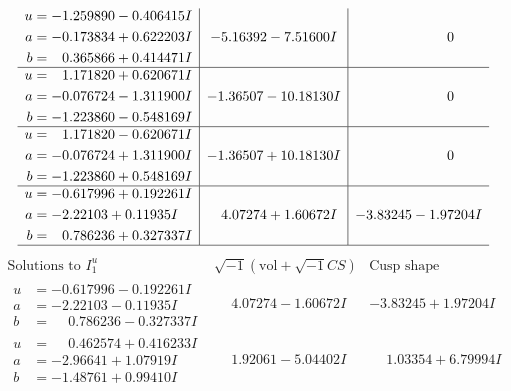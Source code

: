 \documentclass[1p]{elsarticle_modified}
\theoremstyle{definition}
\newcommand{\I}{\sqrt{-1}}
\begin{document}
$$\begin{array}{c|c|c}
\begin{aligned}
u &= -1.259890 - 0.406415 I \\
a &= -0.173834 + 0.622203 I \\
b &= \phantom{-}0.365866 + 0.414471 I\end{aligned}
 & -5.16392 - 7.51600 I & \phantom{-0.000000 } 0 \\ \hline\begin{aligned}
u &= \phantom{-}1.171820 + 0.620671 I \\
a &= -0.076724 - 1.311900 I \\
b &= -1.223860 - 0.548169 I\end{aligned}
 & -1.36507 - 10.18130 I & \phantom{-0.000000 } 0 \\ \hline\begin{aligned}
u &= \phantom{-}1.171820 - 0.620671 I \\
a &= -0.076724 + 1.311900 I \\
b &= -1.223860 + 0.548169 I\end{aligned}
 & -1.36507 + 10.18130 I & \phantom{-0.000000 } 0 \\ \hline\begin{aligned}
u &= -0.617996 + 0.192261 I \\
a &= -2.22103 + 0.11935 I \\
b &= \phantom{-}0.786236 + 0.327337 I\end{aligned}
 & \phantom{-}4.07274 + 1.60672 I & -3.83245 - 1.97204 I\\
 \hline 
 \end{array}$$\newpage$$\begin{array}{c|c|c}  
\text{Solutions to }I^u_{1}& \I (\text{vol} + \sqrt{-1}CS) & \text{Cusp shape}\\
 \hline 
\begin{aligned}
u &= -0.617996 - 0.192261 I \\
a &= -2.22103 - 0.11935 I \\
b &= \phantom{-}0.786236 - 0.327337 I\end{aligned}
 & \phantom{-}4.07274 - 1.60672 I & -3.83245 + 1.97204 I \\ \hline\begin{aligned}
u &= \phantom{-}0.462574 + 0.416233 I \\
a &= -2.96641 + 1.07919 I \\
b &= -1.48761 + 0.99410 I\end{aligned}
 & \phantom{-}1.92061 - 5.04402 I & \phantom{-}1.03354 + 6.79994 I \\ \hline\begin{aligned}

\end{aligned}
\end{array}$$
\end{document}
